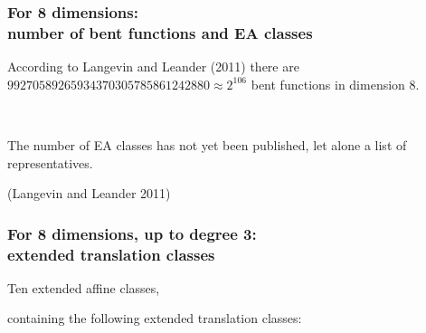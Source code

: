 \documentclass[pdf,sprung,slideColor,nocolorBG]{beamer}
\newenvironment{colortheme}[1]{
\def\ProvidesPackageRCS $##1${\relax}
\renewcommand{\ProcessOptions}{\relax}
\makeatletter

\makeatother
}{}
\newcommand{\slidecite}[1]{\tiny{(#1)}\normalsize{}}
\begin{document}
\begin{colortheme}{jubata}
\begin{frame}
\begin{figure}
\begin{minipage}{.48\textwidth}
  \label{fig:6_4_bent_cayley_graph_index_matrix}
\end{minipage}
\end{figure}
\end{frame}
\begin{colortheme}{seagull}
\begin{frame}
\frametitle{For 8 dimensions: \\ number of bent functions and EA classes}

According to Langevin and Leander (2011)
there are $99270589265934370305785861242880 \approx 2^{106}$ bent functions in dimension 8.

~

The number of EA classes has not yet been published, let alone a list of representatives.

\slidecite{Langevin and Leander 2011}
\end{frame}
\end{colortheme}
\begin{frame}
\frametitle{For 8 dimensions, up to degree 3: \\ extended translation classes}

Ten extended affine classes,

containing the following extended translation classes:


\end{frame}
\end{colortheme}
\end{document}
